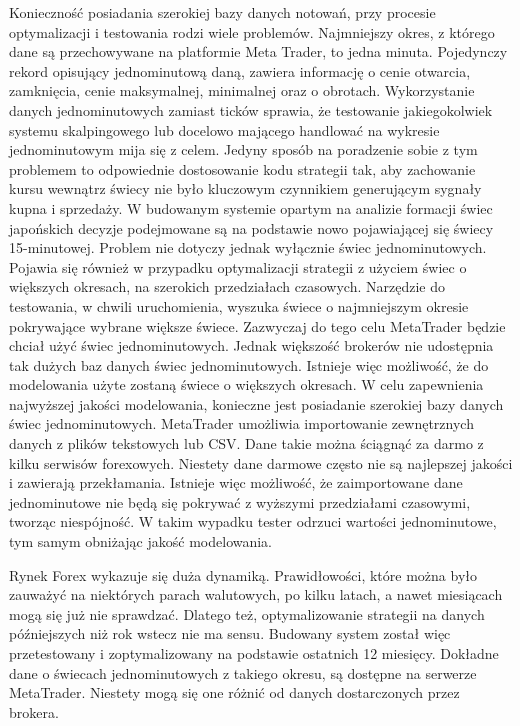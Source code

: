\documentclass[pdflatex,11pt]{aghdpl}
\begin{document}
Konieczność posiadania szerokiej bazy danych notowań, przy procesie optymalizacji i testowania rodzi wiele problemów. Najmniejszy okres, z którego dane są przechowywane na platformie Meta Trader, to jedna minuta. Pojedynczy rekord opisujący jednominutową daną, zawiera informację o cenie otwarcia, zamknięcia, cenie maksymalnej, minimalnej oraz o obrotach. Wykorzystanie danych jednominutowych zamiast ticków sprawia, że testowanie jakiegokolwiek systemu skalpingowego lub docelowo mającego handlować na wykresie jednominutowym mija się z celem. Jedyny sposób na poradzenie sobie z tym problemem to odpowiednie dostosowanie kodu strategii tak, aby zachowanie kursu wewnątrz świecy nie było kluczowym czynnikiem generującym sygnały kupna i sprzedaży. W budowanym systemie opartym na analizie formacji świec japońskich decyzje podejmowane są na podstawie nowo pojawiającej się świecy 15-minutowej. Problem nie dotyczy jednak wyłącznie świec jednominutowych. Pojawia się również w przypadku optymalizacji strategii z użyciem świec o większych okresach, na szerokich przedziałach czasowych. Narzędzie do testowania, w chwili uruchomienia, wyszuka świece o najmniejszym okresie pokrywające wybrane większe świece. Zazwyczaj do tego celu MetaTrader będzie chciał użyć świec jednominutowych. Jednak większość brokerów nie udostępnia tak dużych baz danych świec jednominutowych. Istnieje więc możliwość, że do modelowania użyte zostaną świece o większych okresach. W celu zapewnienia najwyższej jakości modelowania, konieczne jest posiadanie szerokiej bazy danych świec jednominutowych.
MetaTrader umożliwia importowanie zewnętrznych danych z plików tekstowych lub CSV. Dane takie można ściągnąć za darmo z kilku serwisów forexowych. Niestety dane darmowe często nie są najlepszej jakości i zawierają przekłamania. Istnieje więc możliwość, że zaimportowane dane jednominutowe nie będą się pokrywać z wyższymi przedziałami czasowymi, tworząc niespójność. W takim wypadku tester odrzuci wartości jednominutowe, tym samym obniżając jakość modelowania.
 
Rynek Forex wykazuje się duża dynamiką. Prawidłowości, które można było zauważyć na niektórych parach walutowych, po kilku latach, a nawet miesiącach mogą się już nie sprawdzać. Dlatego też, optymalizowanie strategii na danych późniejszych niż rok wstecz nie ma sensu. Budowany system został więc przetestowany i zoptymalizowany na podstawie ostatnich 12 miesięcy. Dokładne dane o świecach jednominutowych z takiego okresu, są dostępne na serwerze MetaTrader. Niestety mogą się one różnić od danych dostarczonych przez brokera.
\end{document}
